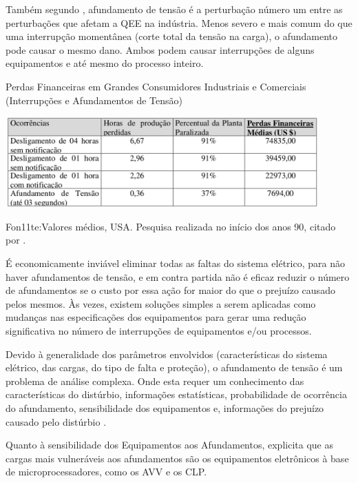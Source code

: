 \par
Também segundo \cite{ALV10}, afundamento de tensão é a perturbação número um entre as perturbações que afetam a QEE na indústria. Menos severo e mais comum do que uma interrupção momentânea (corte total da tensão na carga), o afundamento pode causar o mesmo dano. Ambos podem causar interrupções de alguns equipamentos e até mesmo do processo inteiro.
\begin{table}[!h]
\begin{center}
\caption{Perdas Financeiras em Grandes Consumidores Industriais e Comerciais (Interrupções e Afundamentos de Tensão)}
\includegraphics[width=12cm]{imagens/tab3_cap2.png}
\par{\small Fon11te:Valores médios, USA. Pesquisa realizada no início dos anos 90, citado por \cite{ALV10}.}
\label{fig:tabperdas}
\end{center}
\end{table}
\par
É economicamente inviável eliminar todas as faltas do sistema elétrico, para não haver afundamentos de tensão, e em contra partida não é eficaz reduzir o número de afundamentos se o custo por essa ação for maior do que o prejuízo causado pelos mesmos.
Às vezes, existem soluções simples a serem aplicadas como mudanças nas especificações dos equipamentos para gerar uma redução significativa no número de interrupções de equipamentos e/ou processos.
\par
Devido à generalidade dos parâmetros envolvidos (características do sistema elétrico, das cargas, do tipo de falta e proteção), o afundamento de tensão é um problema de análise complexa. Onde esta requer um conhecimento das características do distúrbio, informações estatísticas, probabilidade de ocorrência do afundamento, sensibilidade dos equipamentos e, informações do prejuízo causado pelo distúrbio \cite{ALV10}.
\par
Quanto à sensibilidade dos Equipamentos aos Afundamentos, \cite{ALV10} explicita que as cargas mais vulneráveis aos afundamentos são os equipamentos eletrônicos à base de microprocessadores, como os AVV e os CLP. 
\par
